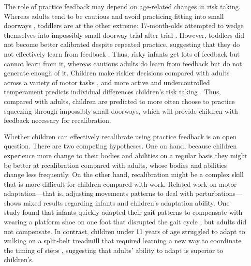 \documentclass[a4paper,man,natbib,floatsintext,noextraspace]{apa6}
\begin{document}
The role of practice feedback may depend on age-related changes in risk taking. Whereas adults tend to be cautious and avoid practicing fitting into small doorways \citep{DoorwayExplore}, toddlers are at the other extreme: 17-month-olds attempted to wedge themselves into impossibly small doorway trial after trial \citep{InfantAps}. However, toddlers did not become better calibrated despite repeated practice, suggesting that they do not effectively learn from feedback \citep[see also][]{JohAdolph2006}. Thus, risky infants get lots of feedback but cannot learn from it, whereas cautious adults do learn from feedback but do not generate enough of it. Children make riskier decisions compared with adults across a variety of motor tasks \citep{ChildReaching, DekkerNardini, Plumert95}, and more active and undercontrolled temperament predicts individual differences children's risk taking \citep{Plumert97}. Thus, compared with adults, children are predicted to more often choose to practice squeezing through impossibly small doorways, which will provide children with feedback necessary for recalibration. 

Whether children can effectively recalibrate using practice feedback is an open question. There are two competing hypotheses. One on hand, because children experience more change to their bodies and abilities on a regular basis they might be better at recalibration compared with adults, whose bodies and abilities change less frequently. On the other hand, recalibration might be a complex skill that is more difficult for children compared with work. Related work on motor adaptation---that is, adjusting movements patterns to deal with perturbations---shows mixed results regarding infants and children's adaptation ability. One study found that infants quickly adapted their gait patterns to compensate with wearing a platform shoe on one foot that disrupted the gait cycle \citep{ColeGill2014}, but adults did not compensate. In contrast, children under 11 years of age struggled to adapt to walking on a split-belt treadmill that required learning a new way to coordinate the timing of steps \cite{Vasudevan2011}, suggesting that adults' ability to adapt is superior to children's.  
\end{document}
